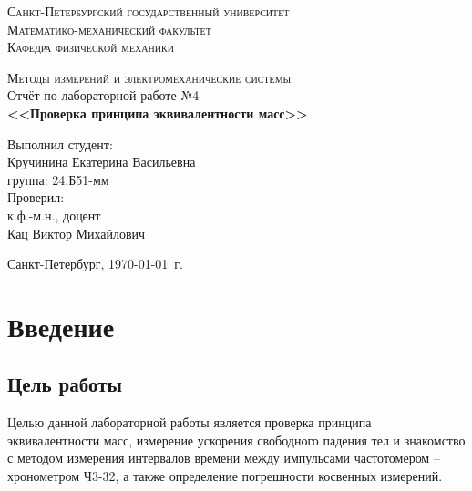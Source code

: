 \documentclass[a4paper,14pt]{extarticle}
\theoremstyle{plain}
\theoremstyle{remark}
\theoremstyle{definition}
\begin{document}
\begin{titlepage}
\begin{center}
\textsc{Санкт-Петербургский государственный университет\\
Математико-механический факультет\\
Кафедра физической механики\\}

\vfill

\textsc{Методы измерений и электромеханические системы\\[3mm]}
Отчёт по лабораторной работе №4\\[6mm]


\textbf{\large<<Проверка принципа эквивалентности масс>>}

\vfill
\end{center}

\hfill
\begin{minipage}{.5\textwidth}
Выполнил студент:\\[2mm] 
Кручинина Екатерина Васильевна\\
группа: 24.Б51-мм\\[5mm]

Проверил:\\[2mm] 
к.ф.-м.н., доцент\\
Кац Виктор Михайлович
\end{minipage}%
\vfill
\begin{center}
 Санкт-Петербург, \yeardate\today\ г.
\end{center}
\end{titlepage}
\tableofcontents
\newpage
\section{Введение}
\subsection{Цель работы}
Целью данной лабораторной работы является проверка принципа эквивалентности масс, измерение ускорения свободного падения тел и
знакомство с методом измерения интервалов времени между импульсами
частотомером – хронометром Ч3-32, а также определение погрешности косвенных измерений.
\end{document}
